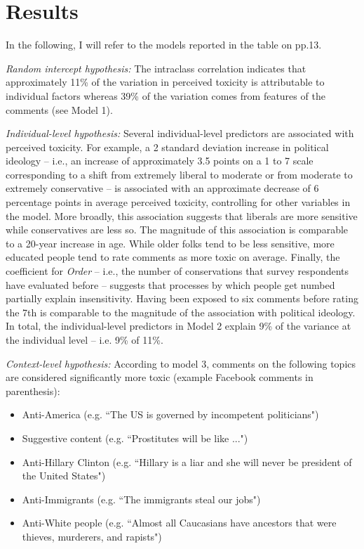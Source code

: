 \documentclass{article}
\begin{document}
\section{Results}

In the following, I will refer to the models reported in the table on pp.13.

\textit{Random intercept hypothesis:} The intraclass correlation indicates that approximately 11\% of the variation in perceived toxicity is attributable to individual factors whereas 39\% of the variation comes from features of the comments (see Model 1). 

\textit{Individual-level hypothesis:} Several individual-level predictors are associated with perceived toxicity. For example, a 2 standard deviation increase in political ideology -- i.e., an increase of approximately 3.5 points on a 1 to 7 scale corresponding to a shift from extremely liberal to moderate or from moderate to extremely conservative -- is associated with an approximate decrease of 6 percentage points in average perceived toxicity, controlling for other variables in the model. More broadly, this association suggests that liberals are more sensitive while conservatives are less so. The magnitude of this association is comparable to a 20-year increase in age. While older folks tend to be less sensitive, more educated people tend to rate comments as more toxic on average. Finally, the coefficient for \textit{Order} -- i.e., the number of conservations that survey respondents have evaluated before -- suggests that processes by which people get numbed partially explain insensitivity. Having been exposed to six comments before rating the 7th is comparable to the magnitude of the association with political ideology. In total, the individual-level predictors in Model 2 explain 9\% of the variance at the individual level -- i.e. 9\% of 11\%.

\textit{Context-level hypothesis:} According to model 3, comments on the following topics are considered significantly more toxic (example Facebook comments in parenthesis): 
\begin{itemize}
    \item Anti-America (e.g. ``The US is governed by incompetent politicians")
    \item Suggestive content (e.g. ``Prostitutes will be like ...")
    \item Anti-Hillary Clinton (e.g. ``Hillary is a liar and she will never be president of the United States")
    \item Anti-Immigrants (e.g. ``The immigrants steal our jobs")
    \item Anti-White people (e.g. ``Almost all Caucasians have ancestors that were thieves, murderers, and rapists")
\end{itemize}
\end{document}
